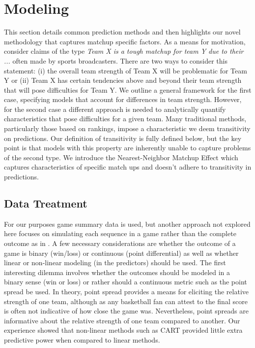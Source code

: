 \section{Modeling}
This section details common prediction methods and then highlights our novel methodology that captures matchup specific factors.  As a means for motivation, consider claims of the type \emph{Team X is a tough matchup for team Y due to their ...} often made by sports broadcasters.  There are two ways to consider this statement: (i) the overall team strength of Team X will be problematic for Team Y or (ii) Team X has certain tendencies above and beyond their team strength that will pose difficulties for Team Y.  We outline a general framework for the first case, specifying models that account for differences in team strength.  However, for the second case a different approach is needed to analytically quantify characteristics that pose difficulties for a given team.  Many traditional methods, particularly those based on rankings, impose a characteristic we deem transitivity on predictions.  Our definition of transitivity is fully defined below, but the key point is that models with this property are inherently unable to capture problems of the second type.  We introduce the Nearest-Neighbor Matchup Effect which captures characteristics of specific match ups and doesn't adhere to transitivity in predictions.  

\subsection{Data Treatment}
For our purposes game summary data is used, but another approach not explored here focuses on simulating each sequence in a game rather than the complete outcome as in \cite{vstrumbelj2012}.  A few necessary considerations are whether the outcome of a game is binary (win/loss) or continuous (point differential) as well as whether linear or non-linear modeling (in the predictors) should be used.  The first interesting dilemma involves whether the outcomes should be modeled in a binary sense (win or loss) or rather should a continuous metric such as the point spread be used.  In theory, point spread provides a means for eliciting the relative strength of one team, although as any basketball fan can attest to the final score is often not indicative of how close the game was.  Nevertheless, point spreads are informative about the relative strength of one team compared to another.  Our experience showed that non-linear methods such as CART provided little extra predictive power when compared to linear methods. 


